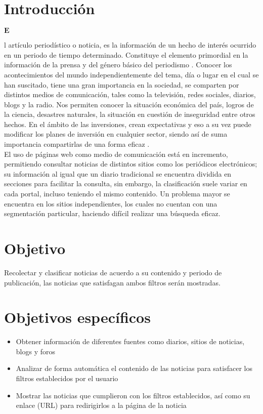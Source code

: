 
\section{Introducción}
\begin{Large}$\mathbf{E}$\end{Large}l artículo periodístico o noticia, es la información de un hecho de interés ocurrido en un periodo de tiempo determinado. Constituye el elemento primordial en la información de la prensa y del género básico del periodismo \citep{CU1}. Conocer los acontecimientos del mundo independientemente del tema, día o lugar en el cual se han suscitado, tiene una gran importancia en la sociedad, se comparten por distintos medios de comunicación, tales como la televisión, redes sociales, diarios, blogs y la radio. Nos permiten conocer la situación económica del país, logros de la ciencia, desastres naturales, la situación en cuestión de inseguridad entre otros hechos. En el ámbito de las inversiones, crean expectativas y eso a su vez puede modificar los planes de inversión en cualquier sector, siendo así de suma importancia compartirlas de una forma eficaz \citep{CU2}.\\

El uso de páginas web como medio de comunicación está en incremento, permitiendo consultar noticias de distintos sitios como los periódicos electrónicos; su información al igual que un diario tradicional se encuentra dividida en secciones para facilitar la consulta, sin embargo, la clasificación suele variar en cada portal, incluso teniendo el mismo contenido. Un problema mayor se encuentra en los sitios independientes, los cuales no cuentan con una segmentación particular, haciendo difícil realizar una búsqueda eficaz.\\

\section{Objetivo}
Recolectar y clasificar noticias de acuerdo a su contenido y periodo de publicación, las noticias que satisfagan ambos filtros serán mostradas.

\section{Objetivos específicos}
\begin{itemize}
  \item Obtener información de diferentes fuentes como diarios, sitios de noticias, blogs y foros
  \item Analizar de forma automática el contenido de las noticias para satisfacer los filtros establecidos por el usuario
  \item Mostrar las noticias que cumplieron con los filtros establecidos, así como su enlace (URL) para redirigirlos a la página de la noticia
\end{itemize}

